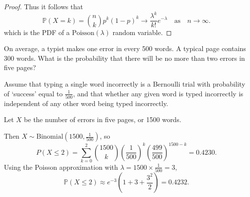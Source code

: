 \documentclass[lecture]{csm}
\newcommand{\prob}{\mathbb{P}}
\begin{document}
\begin{proof}
Thus it follows that 
\[
\prob(X=k) = \binom{n}{k}p^k(1-p)^k \to \frac{\lambda^k}{k!} e^{-\lambda}\quad\text{as}\quad n\to\infty.
\]
which is the PDF of a $\text{Poisson}(\lambda)$ random variable.
\end{proof}

\newpage

\begin{example}
On average, a typist makes one error in every 500 words. A typical page contains 300 words. What is the probability that there will be no more than two errors in five pages?
\end{example}

\begin{solution}
Assume that typing a single word incorrectly is a Bernoulli trial with probability of `success' equal to $\frac{1}{500}$, and that whether any given word is typed incorrectly is independent of any other word being typed incorrectly.

\vspace{2ex}
Let $X$ be the number of errors in five pages, or 1500 words. 

\vspace{2ex}
Then $X\sim\text{Binomial}\left(1500,\frac{1}{500}\right)$, so
\[
P(X\leq 2)
	= \sum_{k=0}^2\binom{1500}{k}\left(\frac{1}{500}\right)^k\left(\frac{499}{500}\right)^{1500-k} = 0.4230.
\]
Using the Poisson approximation with $\lambda=1500\times \frac{1}{500} = 3$,
\[
\prob(X\leq 2) \approx e^{-3}\left(1 + 3 + \frac{3^2}{2}\right) = 0.4232.
\]
\end{solution}


\end{document}
